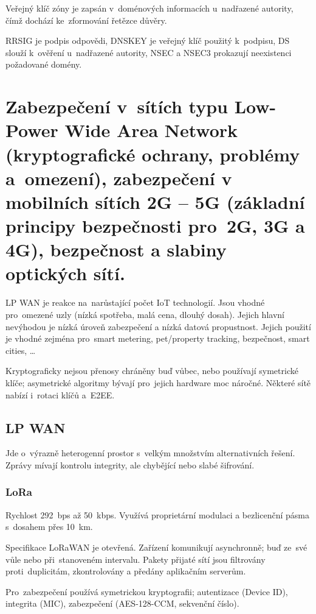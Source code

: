 Veřejný klíč zóny je zapsán v~doménových informacích u~nadřazené autority, čímž dochází ke~zformování řetězce důvěry.

RRSIG je podpis odpovědi, DNSKEY je veřejný klíč použitý k~podpisu, DS slouží k~ověření u~nadřazené autority, NSEC a NSEC3 prokazují neexistenci požadované domény.


\clearpage
\section{Zabezpečení v~sítích typu Low-Power Wide Area Network (kryptografické ochrany, problémy a~omezení), zabezpečení v mobilních sítích 2G -- 5G (základní principy bezpečnosti pro~2G, 3G a 4G), bezpečnost a slabiny optických sítí.}

LP WAN je reakce na~narůstající počet IoT technologií.
Jsou vhodné pro~omezené uzly (nízká spotřeba, malá cena, dlouhý dosah).
Jejich hlavní nevýhodou je nízká úroveň zabezpečení a nízká datová propustnost.
Jejich použití je vhodné zejména pro~smart metering, pet/property tracking, bezpečnost, smart cities, \dots

Kryptograficky nejsou přenosy chráněny buď vůbec, nebo používají symetrické klíče; asymetrické algoritmy bývají pro~jejich hardware moc náročné.
Některé sítě nabízí i~rotaci klíčů a~E2EE.


\subsection{LP WAN}

Jde o~výrazně heterogenní prostor s~velkým množstvím alternativních řešení.
Zprávy mívají kontrolu integrity, ale chybějící nebo slabé šifrování.


\subsubsection{LoRa}

Rychlost 292~bps až 50~kbps.
Využívá proprietární modulaci a bezlicenční pásma s~dosahem přes 10~km.

Specifikace LoRaWAN je otevřená.
Zařízení komunikují asynchronně; buď ze~své vůle nebo při~stanoveném intervalu.
Pakety přijaté sítí jsou filtrovány proti~duplicitám, zkontrolovány a předány aplikačním serverům.

Pro~zabezpečení používá symetrickou kryptografii; autentizace (Device ID), integrita (MIC), zabezpečení (AES-128-CCM, sekvenční číslo).


